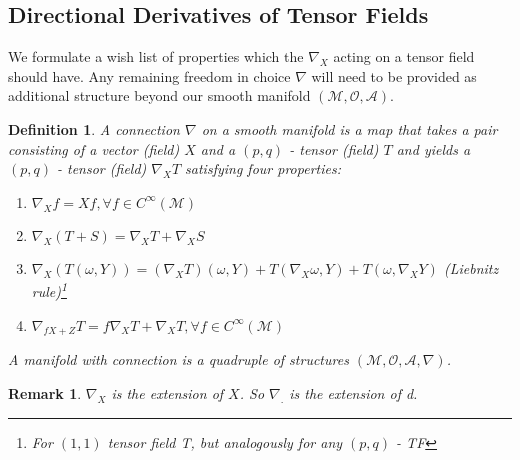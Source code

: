 \documentclass[10pt, oneside]{article}
\newcommand{\M}{\mathcal{M}}
\newtheorem{defn}{Definition}
\newtheorem{remark}{Remark}
\begin{document}
 \subsection*{Directional Derivatives of Tensor Fields}
  We formulate a wish list of properties which the $\nabla_X$ acting on a tensor field should have. Any remaining freedom in choice $\nabla$ will need to be provided as additional structure beyond our smooth manifold $(\M, \mathcal{O}, \mathcal{A})$.
 \begin{defn}
  A connection $\nabla$ on a smooth manifold is a map that takes a pair consisting of a vector (field) $X$ and a $(p,q)$ - tensor (field) $T$ and yields a $(p,q)$ - tensor (field) $\nabla_X T$ satisfying four properties:
  \begin{enumerate}
     \item $\nabla_X f = X f, \forall f \in C^\infty (\M)$
     \item $\nabla_X (T + S) = \nabla_X T + \nabla_X S$
     \item $\nabla_X(T(\omega,Y))= (\nabla_X T)(\omega, Y)+T(\nabla_X \omega,Y)+T(\omega,\nabla_X Y)$ (Liebnitz rule)\footnote{For $(1,1)$ tensor field T, but analogously for any $(p,q)$ - TF}
     \item $\nabla_{f X +Z} T = f \nabla_X T +\nabla_X T, \forall f \in C^\infty (\M)$
  \end{enumerate}
  A manifold with connection is a quadruple of structures $(\M, \mathcal{O},\mathcal{A}, \nabla)$.
  \end{defn}
  \begin{remark}
     $\nabla_X$ is the extension of $X$. So $\nabla_.$ is the extension of d.
  \end{remark}
\end{document}
